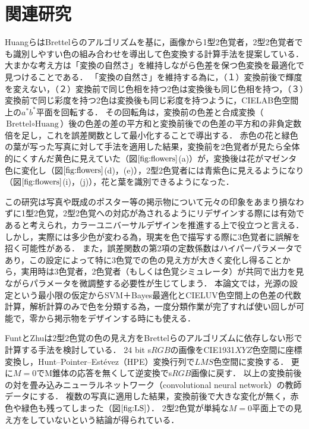 \documentclass[uplatex,paper=a4,fontsize=4.0truemm,jafontsize=4.0truemm,head_space=30.0truemm,foot_space=30.0truemm,baselineskip=8.0truemm,line_length=40zw,gutter=25.0truemm,oneside,openany,fleqn,hanging_panctuation,open_bracket_pos=nibu_tentsuki,dvipdfmx,jis2004,book,titlepage]{jlreq}
\theoremstyle{mystyle}
\newcommand{\mathdisplaystyle}[1]{\(\displaystyle{#1}\)}
\newcommand{\Reference}[1]{\mathdisplaystyle{\ref{#1}}}
\begin{document}
	\chapter{関連研究}
		HuangらはBrettelらのアルゴリズムを基に，画像から1型2色覚者，2型2色覚者でも識別しやすい色の組み合わせを導出して色変換する計算手法を提案している\cite{Huang2007}．
		大まかな考え方は「変換の自然さ」を維持しながら色差を保つ色変換を最適化で見つけることである．
		「変換の自然さ」を維持する為に，（１）変換前後で輝度を変えない，（２）変換前で同じ色相を持つ2色は変換後も同じ色相を持つ，（３）変換前で同じ彩度を持つ2色は変換後も同じ彩度を持つように，CIELAB色空間上の\mathdisplaystyle{a^\ast b^\ast}平面を回転する．
		その回転角は，変換前の色差と合成変換（\mathdisplaystyle{\textrm{Brettel}\circ\textrm{Huang}}）後の色差の差の平方和と変換前後での色差の平方和の非負定数倍を足し，これを誤差関数として最小化することで導出する．
		赤色の花と緑色の葉が写った写真に対して手法を適用した結果，変換前を2色覚者が見たら全体的にくすんだ黄色に見えていた（図\Reference{fig:flowers}(a)）が，変換後は花がマゼンタ色に変化し（図\Reference{fig:flowers}(d)，(e)），2型2色覚者には青紫色に見えるようになり（図\Reference{fig:flowers}(i)，(j)），花と葉を識別できるようになった．

		この研究は写真や既成のポスター等の掲示物について元々の印象をあまり損なわずに1型2色覚，2型2色覚への対応が為されるようにリデザインする際には有効であると考えられ，カラーユニバーサルデザインを推進する上で役立つと言える．
		しかし，実際には多少色が変わる為，現実を色で描写する際に3色覚者に誤解を招く可能性がある．
		また，誤差関数の第2項の定数係数はハイパーパラメータであり，この設定によって特に3色覚での色の見え方が大きく変化し得ることから，実用時は3色覚者，2色覚者（もしくは色覚シミュレータ）が共同で出力を見ながらパラメータを微調整する必要性が生じてしまう．
		本論文では，光源の設定という最小限の仮定からSVM＋Bayes最適化とCIELUV色空間上の色差の代数計算，解析計算のみで色を分類する為，一度分類作業が完了すれば使い回しが可能で，零から掲示物をデザインする時にも使える．

		FuntとZhuは2型2色覚の色の見え方をBrettelらのアルゴリズムに依存しない形で計算する手法を検討している\cite{Funt2018}．
		24 bit s\mathdisplaystyle{RGB}の画像をCIE1931\mathdisplaystyle{XYZ}色空間に座標変換し，Hunt--Pointer--Estévez（HPE）変換行列で\mathdisplaystyle{LMS}色空間に変換する．
		更に\mathdisplaystyle{M=0}でM錐体の応答を無くして逆変換でs\mathdisplaystyle{RGB}画像に戻す．
		以上の変換前後の対を畳み込みニューラルネットワーク（convolutional neural network）の教師データにする．
		複数の写真に適用した結果，変換前後で大きな変化が無く，赤色や緑色も残ってしまった（図\Reference{fig:LS}）．
		2型2色覚が単純な\mathdisplaystyle{M=0}平面上での見え方をしていないという結論が得られている．
\end{document}
